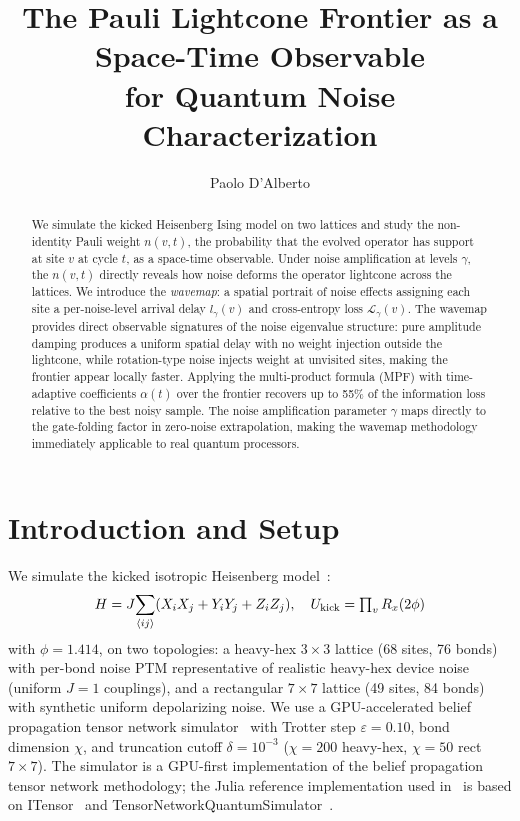 \documentclass[letterpaper]{article}
\title{The Pauli Lightcone Frontier as a Space-Time Observable\\
       for Quantum Noise Characterization}
\author{Paolo D'Alberto}
\begin{document}
\maketitle

\begin{abstract}
We simulate the kicked Heisenberg Ising model on two lattices and
study the non-identity Pauli weight $n(v,t)$, the probability that the
evolved operator has support at site $v$ at cycle $t$, as a space-time
observable.  Under noise amplification at levels $\gamma$, the
$n(v,t)$ directly reveals how noise deforms the operator lightcone
across the lattices.  We introduce the \emph{wavemap}: a spatial
portrait of noise effects assigning each site a per-noise-level
arrival delay $l_\gamma(v)$ and cross-entropy loss
$\mathcal{L}_\gamma(v)$.  The wavemap provides direct observable
signatures of the noise eigenvalue structure: pure amplitude damping
produces a uniform spatial delay with no weight injection outside the
lightcone, while rotation-type noise injects weight at unvisited
sites, making the frontier appear locally faster.  Applying
the multi-product formula (MPF) with time-adaptive coefficients
$\alpha(t)$ over the frontier recovers up to 55\% of the information
loss relative to the best noisy sample.  The noise amplification
parameter $\gamma$ maps directly to the gate-folding factor in
zero-noise extrapolation, making the wavemap methodology immediately
applicable to real quantum processors.
\end{abstract}

\section{Introduction and Setup}
\label{sec:intro}

We simulate the kicked isotropic Heisenberg model~\cite{Begusic2025RealTime}:
\begin{equation}
H = J\!\sum_{\langle ij\rangle}(X_iX_j+Y_iY_j+Z_iZ_j),\quad
U_{\rm kick}=\textstyle\prod_v R_x(2\phi)
\end{equation}
with $\phi=1.414$,
on two topologies: a heavy-hex $3\times3$ lattice (68 sites,
76 bonds) with per-bond noise PTM representative of realistic
heavy-hex device noise (uniform $J=1$ couplings),
and a rectangular $7\times7$ lattice (49 sites, 84 bonds) with synthetic
uniform depolarizing noise.
We use a GPU-accelerated belief propagation tensor network simulator~\cite{dalberto2026ising}
with Trotter step $\varepsilon=0.10$, bond dimension $\chi$, and
truncation cutoff $\delta=10^{-3}$ ($\chi=200$ heavy-hex, $\chi=50$
rect $7\times7$). The simulator is a GPU-first implementation of the
belief propagation tensor network methodology; the Julia reference
implementation used in~\cite{robertson2026lindbladmultiproductformulas}
is based on ITensor~\cite{ITensor} and
TensorNetworkQuantumSimulator~\cite{tindall2023gauging_bp,rudolph2025simulating2d}.
\end{document}
